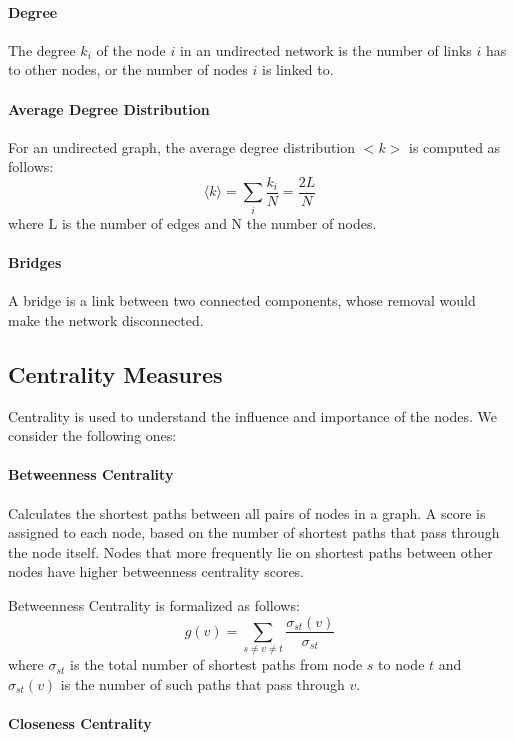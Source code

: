 \documentclass[10pt,twocolumn,letterpaper]{article}
\begin{document}
\paragraph{Degree}

The degree $k_i$ of the node $i$ in an undirected network is the number of links $i$ has to other nodes, or the number of nodes $i$ is linked to.

\paragraph{Average Degree Distribution}

For an undirected graph, the average degree distribution $<k>$ is computed as follows:
$$
\langle k\rangle=\sum_{i} \frac{k_{i}}{N}=\frac{2 L}{N}
$$
where L is the number of edges and N the number of nodes.

\paragraph{Bridges}

A bridge is a link between two connected components, whose removal would make the network disconnected.

\subsection{Centrality Measures}

Centrality is used to understand the influence and importance of the nodes. We consider the following ones:

\paragraph{Betweenness Centrality}

Calculates the shortest paths between all pairs of nodes in a graph. A score is assigned to each node, based on the number of shortest paths that pass through the node itself. Nodes that more frequently lie on shortest paths between other nodes have higher betweenness centrality scores.

Betweenness Centrality is formalized as follows:
$$
g(v)=\sum_{s \neq v \neq t} \frac{\sigma_{s t}(v)}{\sigma_{s t}}
$$
where $\sigma_{s t}$ is the total number of shortest paths from node $s$ to node $t$ and $\sigma_{s t}(v)$ is the number of such paths that pass through $v$.

\paragraph{Closeness Centrality}
\end{document}
